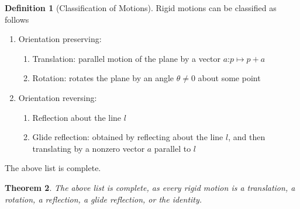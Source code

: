 \documentclass[12pt]{article}
\newtheorem{thm}{Theorem}[section]
\theoremstyle{definition}
\newtheorem{defn}[thm]{Definition}
\theoremstyle{remark}
\numberwithin{equation}{section}
\begin{document}
\vspace{15pt}

\begin{defn}[Classification of Motions]
        Rigid motions can be classified as follows\begin{enumerate}
                \item Orientation preserving: \begin{enumerate}
                                \item Translation: parallel motion of the plane by a vector $a$:$p\mapsto p + a$
                                \item Rotation: rotates the plane by an angle $\theta \neq 0$ about some point
                \end{enumerate}
        \item Orientation reversing: \begin{enumerate}
                        \item Reflection about the line $l$
                        \item Glide reflection: obtained by reflecting about the line $l$, and then translating by a nonzero vector $a$ parallel to $l$
        \end{enumerate}
        \end{enumerate}
        The above list is complete.
\end{defn}


\vspace{15pt}


\begin{thm}
        The above list is complete, as every rigid motion is a translation, a rotation, a reflection, a glide reflection, or the identity.
\end{thm}
\end{document}

